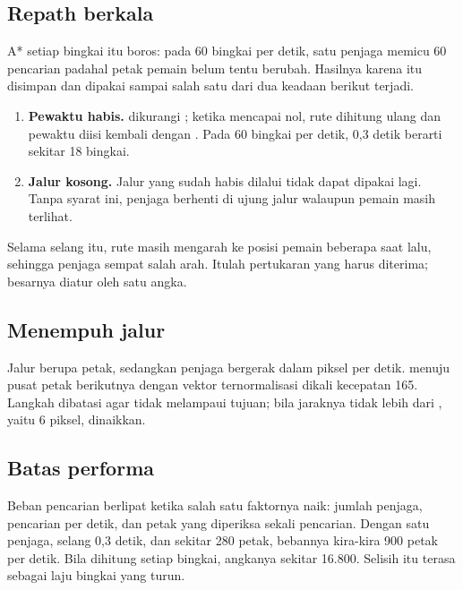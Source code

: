 \subsection*{Repath berkala}

A* setiap bingkai itu boros: pada 60 bingkai per detik, satu penjaga
memicu 60 pencarian padahal petak pemain belum tentu berubah. Hasilnya
karena itu disimpan dan dipakai sampai salah satu dari dua keadaan berikut
terjadi.

\begin{enumerate}[leftmargin=1.5em, itemsep=0.2em]
  \item \textbf{Pewaktu habis.}  dikurangi
        ; ketika mencapai nol, rute dihitung ulang dan
        pewaktu diisi kembali dengan . Pada 60
        bingkai per detik, 0,3 detik berarti sekitar 18 bingkai.
  \item \textbf{Jalur kosong.} Jalur yang sudah habis dilalui tidak dapat
        dipakai lagi. Tanpa syarat ini, penjaga berhenti di ujung jalur
        walaupun pemain masih terlihat.
\end{enumerate}

Selama selang itu, rute masih mengarah ke posisi pemain beberapa saat lalu,
sehingga penjaga sempat salah arah. Itulah pertukaran yang harus diterima;
besarnya diatur oleh satu angka.

\subsection*{Menempuh jalur}

Jalur berupa petak, sedangkan penjaga bergerak dalam piksel per detik.
 menuju pusat petak berikutnya dengan vektor
ternormalisasi dikali kecepatan 165. Langkah dibatasi agar tidak melampaui
tujuan; bila jaraknya tidak lebih dari , yaitu 6
piksel,  dinaikkan.

\subsection*{Batas performa}

Beban pencarian berlipat ketika salah satu faktornya naik: jumlah penjaga,
pencarian per detik, dan petak yang diperiksa sekali pencarian. Dengan satu
penjaga, selang 0,3 detik, dan sekitar 280 petak, bebannya kira-kira 900
petak per detik. Bila dihitung setiap bingkai, angkanya sekitar 16.800.
Selisih itu terasa sebagai laju bingkai yang turun.

